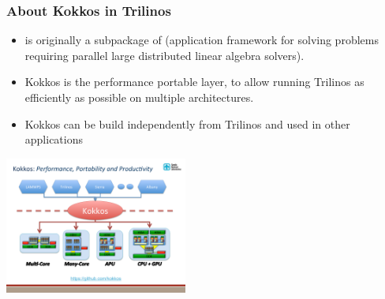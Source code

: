 \begin{frame}
  \frametitle{About Kokkos in Trilinos}

  \begin{itemize}
  \item {} is originally a subpackage of  (application framework for solving problems requiring parallel large distributed linear algebra solvers).
  \item Kokkos is the performance portable layer, to allow running Trilinos as efficiently as possible on multiple architectures.
  \item Kokkos can be build independently from Trilinos and used in other applications
  \end{itemize}

  \begin{center}
    \includegraphics[width=6cm]{images/Kokkos-Multi-CoE_slide2}
  \end{center}
  
\end{frame}

